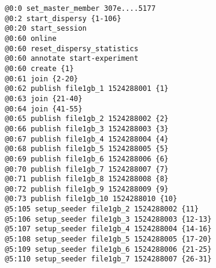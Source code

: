 \begin{appendices}
%

\begin{lstlisting}[caption={Scenario 1.}]
@0:0 set_master_member 307e....5177
@0:2 start_dispersy {1-106}
@0:20 start_session
@0:60 online
@0:60 reset_dispersy_statistics
@0:60 annotate start-experiment
@0:60 create {1}
@0:61 join {2-20}
@0:62 publish file1gb_1 1524288001 {1}
@0:63 join {21-40}
@0:64 join {41-55}
@0:65 publish file1gb_2 1524288002 {2}
@0:66 publish file1gb_3 1524288003 {3}
@0:67 publish file1gb_4 1524288004 {4}
@0:68 publish file1gb_5 1524288005 {5}
@0:69 publish file1gb_6 1524288006 {6}
@0:70 publish file1gb_7 1524288007 {7}
@0:71 publish file1gb_8 1524288008 {8}
@0:72 publish file1gb_9 1524288009 {9}
@0:73 publish file1gb_10 1524288010 {10}
@5:105 setup_seeder file1gb_2 1524288002 {11}
@5:106 setup_seeder file1gb_3 1524288003 {12-13}
@5:107 setup_seeder file1gb_4 1524288004 {14-16}
@5:108 setup_seeder file1gb_5 1524288005 {17-20}
@5:109 setup_seeder file1gb_6 1524288006 {21-25}
@5:110 setup_seeder file1gb_7 1524288007 {26-31}

\end{lstlisting}
\end{appendices}
